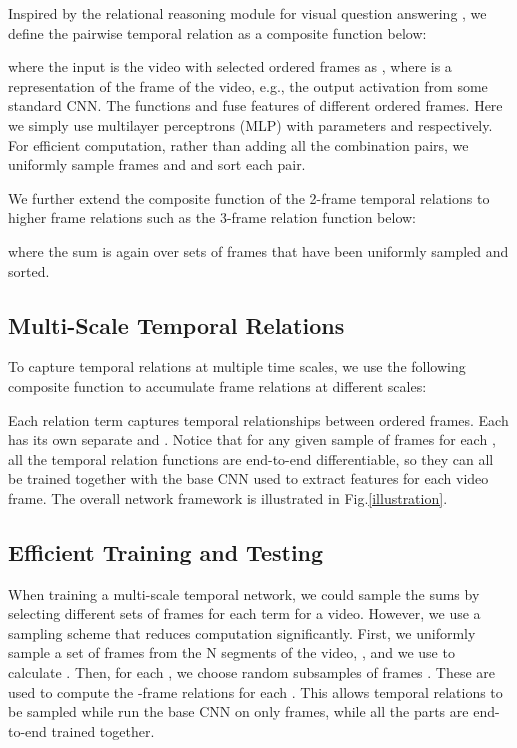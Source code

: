 \documentclass[runningheads]{llncs}
\begin{document}
Inspired by the relational reasoning module for visual question answering \cite{santoro2017simple}, we define the pairwise temporal relation as a composite function below: 

where the input is the video  with  selected ordered frames as , where  is a representation of the  frame of the video, e.g., the output activation from some standard CNN. The functions  and  fuse features of different ordered frames. Here we simply use multilayer perceptrons (MLP) with parameters  and  respectively.  For efficient computation, rather than adding all the combination pairs, we uniformly sample frames  and  and sort each pair.

We further extend the composite function of the 2-frame temporal relations to higher frame relations such as the 3-frame relation function below: 

where the sum is again over sets of frames   that have been uniformly sampled and sorted.

\subsection{Multi-Scale Temporal Relations}
To capture temporal relations at multiple time scales, we use the following composite function to accumulate frame relations at different scales:

Each relation term  captures temporal relationships between  ordered frames.  Each  has its own separate  and . Notice that for any given sample of  frames for each , all the temporal relation functions are end-to-end differentiable, so they can all be trained together with the base CNN used to extract features for each video frame. The overall network framework is illustrated in Fig.\ref{illustration}.

\subsection{Efficient Training and Testing}

When training a multi-scale temporal network, we could sample the sums by selecting different sets of  frames for each  term for a video. However, we use a sampling scheme that reduces computation significantly. First, we uniformly sample a set of  frames from the N segments of the video, , and we use  to calculate .  Then, for each , we choose  random subsamples of  frames .  These are used to compute the -frame relations for each .  This allows  temporal relations to be sampled while run the base CNN on only  frames, while all the parts are end-to-end trained together.  
\end{document}
